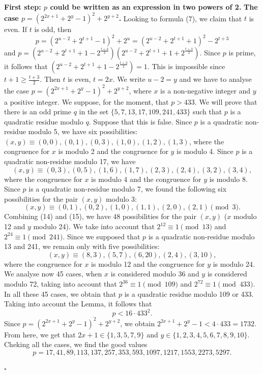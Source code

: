 \documentclass[12pt]{article}
\newenvironment{proof}{{\it Proof.}}{\hfill $ \square $ \vskip 4mm}
\begin{document}
{\begin{proof} {\bf First step: $p$ could be written as an expression in two powers of 2.}
{\bf The case $p=(2^{2x+1}+2^y-1)^2+2^{y+2}$.} Looking to formula (7), we claim that $t$ is even. If $t$ is odd, then 
$$p=(2^{u-2}+2^{t+1}-1)^2+2^u=(2^{u-2}+2^{t+1}+1)^2-2^{t+3}$$
and $p=(2^{u-2}+2^{t+1}+1-2^{\frac{t+3}{2}})(2^{u-2}+2^{t+1}+1+2^{\frac{t+3}{2}}).$ Since $p$ is prime, it follows that $(2^{u-2}+2^{t+1}+1-2^{\frac{t+3}{2}})=1$. This is impossible since $t+1\geq \frac{t+3}{2}$. Then $t$ is even, $t=2x$. We write $u-2=y$ and we have to analyse the case $p=(2^{2x+1}+2^y-1)^2+2^{y+2}$, where $x$ is a non-negative integer and $y$ a positive integer. 
We suppose, for the moment, that $p>433$. We will prove that there is an odd prime $q$ in the set $\{5,7,13,17,109,241,433\}$ such that $p$ is a quadratic residue modulo $q$. Suppose that this is false. Since $p$ is a quadratic non-residue modulo 5, we have six possibilities: $(x,y)\equiv (0,0), (0,1), (0,3), (1,0),(1,2),(1,3)$, where the congruence for $x$ is modulo 2 and the congruence for $y$ is modulo 4. Since $p$ is a quadratic non-residue modulo 17, we have 
\begin{equation}
(x,y)\equiv (0,3), (0,5),(1,6),(1,7),(2,3),(2,4),(3,2),(3,4),
\end{equation}
where the congruence for $x$ is modulo 4 and the congruence for $y$ is modulo 8. Since $p$ is a quadratic non-residue modulo 7, we found the following six possibilities for the pair $(x,y)$ modulo 3:
\begin{equation}
(x,y)\equiv (0,1), (0,2),(1,0),(1,1),(2,0),(2,1) \pmod 3.
\end{equation}
Combining (14) and (15), we have 48 possibilities for the pair $(x,y)$ ($x$ modulo 12 and $y$ modulo 24). We take into account that $2^{12}\equiv 1 \pmod {13}$ and $2^{24}\equiv 1 \pmod {241}$. Since we supposed that $p$ is a quadratic non-residue modulo 13 and 241, we remain only with five possibilities:
\begin{equation}
(x,y)\equiv (8,3), (5,7),(6,20),(2,4),(3,10),
\end{equation}
where the congruence for $x$ is modulo 12 and the congruence for $y$ is modulo 24. We analyse now 45 cases, when $x$ is considered modulo 36 and $y$ is considered modulo 72, taking into account that $2^{36}\equiv 1 \pmod {109}$ and $2^{72}\equiv 1 \pmod {433}$. In all these 45 cases, we obtain that $p$ is a quadratic residue modulo 109 or 433. Taking into account the Lemma, it follows that 
$$p<16\cdot 433^2.$$ Since $p=(2^{2x+1}+2^y-1)^2+2^{y+2}$, we obtain $2^{2x+1}+2^y-1<4\cdot 433=1732.$ From here, we get that $2x+1\in \{1,3,5,7,9\}$ and $y\in \{1,2,3,4,5,6,7,8,9,10\}$. Cheking all the cases, we find the good values 
$$p=17,41,89,113,137,257,353,593,1097,1217,1553,2273,5297.$$


\end{proof}}
\end{document}
